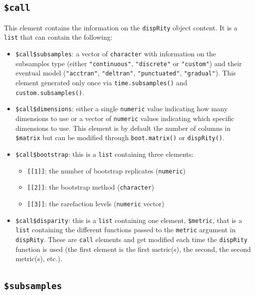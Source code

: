 \documentclass[]{book}
\providecommand{\tightlist}{%
  \setlength{\itemsep}{0pt}\setlength{\parskip}{0pt}}
\theoremstyle{definition}
\theoremstyle{definition}
\theoremstyle{remark}
\begin{document}
\subsection{\texorpdfstring{\texttt{\$call}}{\$call}}\label{call}

This element contains the information on the \texttt{dispRity} object
content. It is a \texttt{list} that can contain the following:

\begin{itemize}
\tightlist
\item
  \texttt{\$call\$subsamples}: a vector of \texttt{character} with
  information on the subsamples type (either \texttt{"continuous"},
  \texttt{"discrete"} or \texttt{"custom"}) and their eventual model
  (\texttt{"acctran"}, \texttt{"deltran"}, \texttt{"punctuated"},
  \texttt{"gradual"}). This element generated only once via
  \texttt{time.subsamples()} and \texttt{custom.subsamples()}.
\item
  \texttt{\$call\$dimensions}: either a single \texttt{numeric} value
  indicating how many dimensions to use or a vector of \texttt{numeric}
  values indicating which specific dimensions to use. This element is by
  default the number of columns in \texttt{\$matrix} but can be modified
  through \texttt{boot.matrix()} or \texttt{dispRity()}.
\item
  \texttt{\$call\$bootstrap}: this is a \texttt{list} containing three
  elements:

  \begin{itemize}
  \tightlist
  \item
    \texttt{{[}{[}1{]}{]}}: the number of bootstrap replicates
    (\texttt{numeric})
  \item
    \texttt{{[}{[}2{]}{]}}: the bootstrap method (\texttt{character})
  \item
    \texttt{{[}{[}3{]}{]}}: the rarefaction levels (\texttt{numeric}
    vector)
  \end{itemize}
\item
  \texttt{\$call\$disparity}: this is a \texttt{list} containing one
  element, \texttt{\$metric}, that is a \texttt{list} containing the
  different functions passed to the \texttt{metric} argument in
  \texttt{dispRity}. These are \texttt{call} elements and get modified
  each time the \texttt{dispRity} function is used (the first element is
  the first metric(s), the second, the second metric(s), etc.).
\end{itemize}

\subsection{\texorpdfstring{\texttt{\$subsamples}}{\$subsamples}}\label{subsamples}
\end{document}
